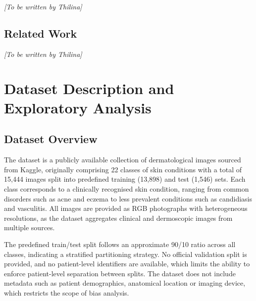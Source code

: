 \documentclass[11pt,a4paper]{article}
\begin{document}
\textit{[To be written by Thilina]}

\subsection{Related Work}
%

\textit{[To be written by Thilina]}

\section{Dataset Description and Exploratory Analysis}
\label{sec:eda}

\subsection{Dataset Overview}

The dataset is a publicly available collection of dermatological images sourced from Kaggle, originally comprising 22 classes of skin conditions with a total of 15,444 images split into predefined training (13,898) and test (1,546) sets. Each class corresponds to a clinically recognised skin condition, ranging from common disorders such as acne and eczema to less prevalent conditions such as candidiasis and vasculitis. All images are provided as RGB photographs with heterogeneous resolutions, as the dataset aggregates clinical and dermoscopic images from multiple sources.

The predefined train/test split follows an approximate 90/10 ratio across all classes, indicating a stratified partitioning strategy. No official validation split is provided, and no patient-level identifiers are available, which limits the ability to enforce patient-level separation between splits. The dataset does not include metadata such as patient demographics, anatomical location or imaging device, which restricts the scope of bias analysis.
\end{document}
